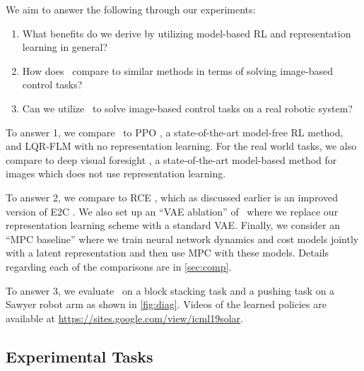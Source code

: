 We aim to answer the following through our experiments:
\vspace{-.5em}
\begin{enumerate}
    \itemsep0em
    \item What benefits do we derive by utilizing model-based RL and representation learning in general?
    \item How does \metabbr\ compare to similar methods in terms of solving image-based control tasks?
    \item Can we utilize \metabbr\ to solve image-based control tasks on a real robotic system?
\end{enumerate}
\vspace{-.5em}
To answer 1, we compare \metabbr\ to PPO \citep{ppo}, a state-of-the-art model-free RL method, and LQR-FLM with no representation learning. For the real world tasks, we also compare to deep visual foresight \citep[DVF; ][]{vf}, a state-of-the-art model-based method for images which does not use representation learning.

To answer 2, we compare to RCE \citep{rce}, which as discussed earlier is an improved version of E2C \citep{e2c}. We also set up an ``VAE ablation'' of \metabbr\ where we replace our representation learning scheme with a standard VAE. Finally, we consider an ``MPC baseline'' where we train neural network dynamics and cost models jointly with a latent representation and then use MPC with these models. Details regarding each of the comparisons are in \autoref{sec:comp}.

To answer 3, we evaluate \metabbr\ on a block stacking task and a pushing task on a Sawyer robot arm as shown in \autoref{fig:diag}. Videos of the learned policies are available at \mbox{\footnotesize{\url{https://sites.google.com/view/icml19solar}}.}

\subsection{Experimental Tasks}

